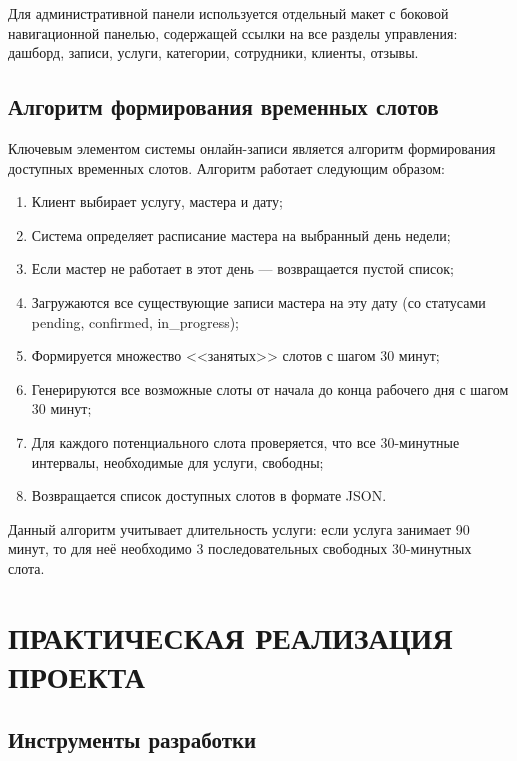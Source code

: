 \documentclass[14pt,a4paper,oneside]{extarticle}
\begin{document}
Для административной панели используется отдельный макет с боковой навигационной панелью, содержащей ссылки на все разделы управления: дашборд, записи, услуги, категории, сотрудники, клиенты, отзывы.

\subsection{Алгоритм формирования временных слотов}

Ключевым элементом системы онлайн-записи является алгоритм формирования доступных временных слотов. Алгоритм работает следующим образом:

\begin{enumerate}[leftmargin=2cm]
    \item Клиент выбирает услугу, мастера и дату;
    \item Система определяет расписание мастера на выбранный день недели;
    \item Если мастер не работает в этот день --- возвращается пустой список;
    \item Загружаются все существующие записи мастера на эту дату (со статусами pending, confirmed, in\_progress);
    \item Формируется множество <<занятых>> слотов с шагом 30 минут;
    \item Генерируются все возможные слоты от начала до конца рабочего дня с шагом 30 минут;
    \item Для каждого потенциального слота проверяется, что все 30-минутные интервалы, необходимые для услуги, свободны;
    \item Возвращается список доступных слотов в формате JSON.
\end{enumerate}

Данный алгоритм учитывает длительность услуги: если услуга занимает 90 минут, то для неё необходимо 3 последовательных свободных 30-минутных слота.


\newpage
\section{ПРАКТИЧЕСКАЯ РЕАЛИЗАЦИЯ ПРОЕКТА}

\subsection{Инструменты разработки}
\end{document}
